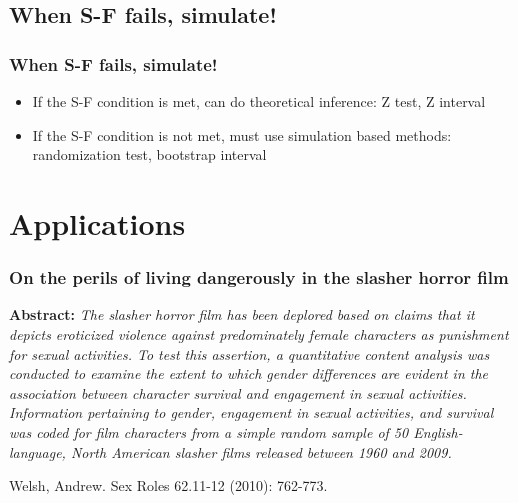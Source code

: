 \documentclass[slidestop,compress,mathserif,12pt,t,professionalfonts,xcolor=table]{beamer}
\begin{document}

\subsection{When S-F fails, simulate!}
\label{mi3}


\begin{frame}
\frametitle{When S-F fails, simulate!}

\begin{itemize}

\item If the S-F condition is met, can do theoretical inference: Z test, Z interval

\item If the S-F condition is not met, must use simulation based methods: randomization test, bootstrap interval

\end{itemize}

\end{frame}


\section{Applications}


\begin{frame}
\frametitle{On the perils of living dangerously in the slasher horror film}

{\small \textbf{Abstract:} \textit{The slasher horror film has been deplored based on claims that it depicts eroticized 
violence against predominately female characters as punishment for sexual activities. To test this assertion, a 
quantitative content analysis was conducted to examine the extent to which gender differences are evident in the 
association between character survival and engagement in sexual activities. Information pertaining to gender, 
engagement in sexual activities, and survival was coded for film characters from a simple random sample of 50 
English-language, North American slasher films released between 1960 and 2009.}}

\vfill

{\scriptsize Welsh, Andrew.  
Sex Roles 62.11-12 (2010): 762-773.}

\end{frame}
\end{document}
